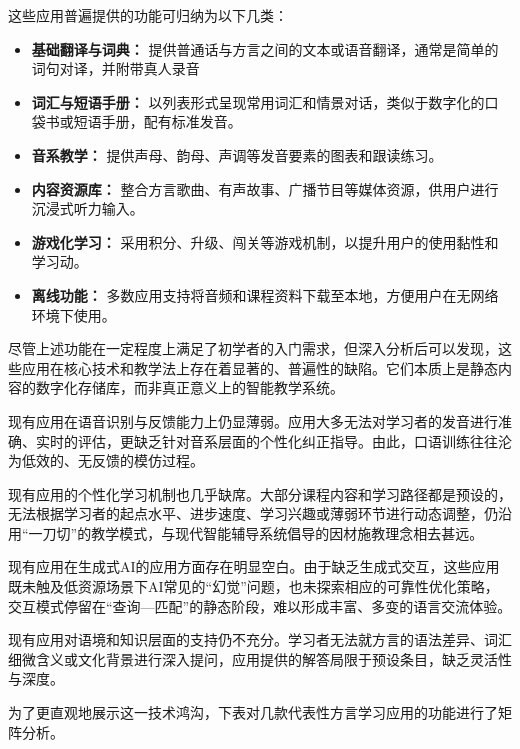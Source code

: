 这些应用普遍提供的功能可归纳为以下几类：
\begin{itemize}
    \item \textbf{基础翻译与词典：} 提供普通话与方言之间的文本或语音翻译，通常是简单的词句对译，并附带真人录音
    \item \textbf{词汇与短语手册：} 以列表形式呈现常用词汇和情景对话，类似于数字化的口袋书或短语手册，配有标准发音。
    \item \textbf{音系教学：} 提供声母、韵母、声调等发音要素的图表和跟读练习。
    \item \textbf{内容资源库：} 整合方言歌曲、有声故事、广播节目等媒体资源，供用户进行沉浸式听力输入。
    \item \textbf{游戏化学习：} 采用积分、升级、闯关等游戏机制，以提升用户的使用黏性和学习动。
    \item \textbf{离线功能：} 多数应用支持将音频和课程资料下载至本地，方便用户在无网络环境下使用。
\end{itemize}

尽管上述功能在一定程度上满足了初学者的入门需求，但深入分析后可以发现，这些应用在核心技术和教学法上存在着显著的、普遍性的缺陷。它们本质上是静态内容的数字化存储库，而非真正意义上的智能教学系统。

现有应用在语音识别与反馈能力上仍显薄弱。应用大多无法对学习者的发音进行准确、实时的评估，更缺乏针对音系层面的个性化纠正指导。由此，口语训练往往沦为低效的、无反馈的模仿过程。

现有应用的个性化学习机制也几乎缺席。大部分课程内容和学习路径都是预设的，无法根据学习者的起点水平、进步速度、学习兴趣或薄弱环节进行动态调整，仍沿用“一刀切”的教学模式，与现代智能辅导系统倡导的因材施教理念相去甚远。

现有应用在生成式AI的应用方面存在明显空白。由于缺乏生成式交互，这些应用既未触及低资源场景下AI常见的“幻觉”问题，也未探索相应的可靠性优化策略，交互模式停留在“查询—匹配”的静态阶段，难以形成丰富、多变的语言交流体验。

现有应用对语境和知识层面的支持仍不充分。学习者无法就方言的语法差异、词汇细微含义或文化背景进行深入提问，应用提供的解答局限于预设条目，缺乏灵活性与深度。

为了更直观地展示这一技术鸿沟，下表对几款代表性方言学习应用的功能进行了矩阵分析。

